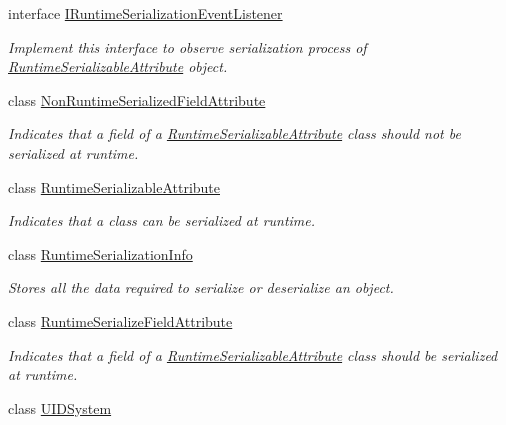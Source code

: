 \begin{DoxyCompactItemize}
interface \hyperlink{interface_voxel_busters_1_1_runtime_serialization_1_1_i_runtime_serialization_event_listener}{I\+Runtime\+Serialization\+Event\+Listener}
\begin{DoxyCompactList}\small\item\em Implement this interface to observe serialization process of \hyperlink{class_voxel_busters_1_1_runtime_serialization_1_1_runtime_serializable_attribute}{Runtime\+Serializable\+Attribute} object. \end{DoxyCompactList}\item 
class \hyperlink{class_voxel_busters_1_1_runtime_serialization_1_1_non_runtime_serialized_field_attribute}{Non\+Runtime\+Serialized\+Field\+Attribute}
\begin{DoxyCompactList}\small\item\em Indicates that a field of a \hyperlink{class_voxel_busters_1_1_runtime_serialization_1_1_runtime_serializable_attribute}{Runtime\+Serializable\+Attribute} class should not be serialized at runtime. \end{DoxyCompactList}\item 
class \hyperlink{class_voxel_busters_1_1_runtime_serialization_1_1_runtime_serializable_attribute}{Runtime\+Serializable\+Attribute}
\begin{DoxyCompactList}\small\item\em Indicates that a class can be serialized at runtime. \end{DoxyCompactList}\item 
class \hyperlink{class_voxel_busters_1_1_runtime_serialization_1_1_runtime_serialization_info}{Runtime\+Serialization\+Info}
\begin{DoxyCompactList}\small\item\em Stores all the data required to serialize or deserialize an object. \end{DoxyCompactList}\item 
class \hyperlink{class_voxel_busters_1_1_runtime_serialization_1_1_runtime_serialize_field_attribute}{Runtime\+Serialize\+Field\+Attribute}
\begin{DoxyCompactList}\small\item\em Indicates that a field of a \hyperlink{class_voxel_busters_1_1_runtime_serialization_1_1_runtime_serializable_attribute}{Runtime\+Serializable\+Attribute} class should be serialized at runtime. \end{DoxyCompactList}\item 
class \hyperlink{class_voxel_busters_1_1_runtime_serialization_1_1_u_i_d_system}{U\+I\+D\+System}

\end{DoxyCompactItemize}
